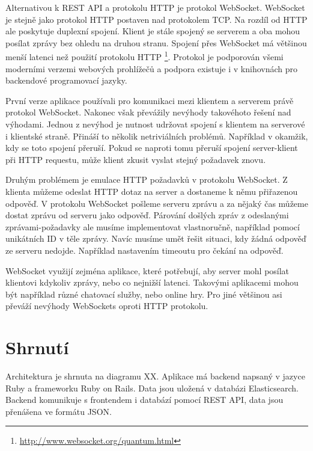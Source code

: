 Alternativou k REST API a protokolu HTTP je protokol WebSocket. WebSocket je stejně jako protokol HTTP postaven nad protokolem TCP. Na rozdíl od HTTP ale poskytuje duplexní spojení. Klient je stále spojený se serverem a oba mohou posílat zprávy bez ohledu na druhou stranu. Spojení přes WebSocket má většinou menší latenci než použití protokolu HTTP \footnote{\url{http://www.websocket.org/quantum.html}}. Protokol je podporován všemi moderními verzemi webových prohlížečů a podpora existuje i v knihovnách pro backendové programovací jazyky.

První verze aplikace používali pro komunikaci mezi klientem a serverem právě protokol WebSocket. Nakonec však převážily nevýhody takovéhoto řešení nad výhodami. Jednou z nevýhod je nutnost udržovat spojení s klientem na serverové i klientské straně. Přináší to několik netriviálních problémů. Například v okamžik, kdy se toto spojení přeruší. Pokud se naproti tomu přeruší spojení server-klient při HTTP requestu, může klient zkusit vyslat stejný požadavek znovu.

Druhým problémem je emulace HTTP požadavků v protokolu WebSocket. Z klienta můžeme odeslat HTTP dotaz na server a dostaneme k němu přiřazenou odpověď. V protokolu WebSocket pošleme serveru zprávu a za nějaký čas můžeme dostat zprávu od serveru jako odpověď. Párování došlých zpráv z odeslanými zprávami-požadavky ale musíme implementovat vlastnoručně, například pomocí unikátních ID v těle zprávy. Navíc musíme umět řešit situaci, kdy žádná odpověď ze serveru nedojde. Například nastavením timeoutu pro čekání na odpověď.

WebSocket využijí zejména aplikace, které potřebují, aby server mohl posílat klientovi kdykoliv zprávy, nebo co nejnižší latenci. Takovými aplikacemi mohou být například různé chatovací služby, nebo online hry. Pro jiné většinou asi převáží nevýhody WebSockets oproti HTTP protokolu.

\section{Shrnutí}

Architektura je shrnuta na diagramu XX. Aplikace má backend napsaný v jazyce Ruby a frameworku Ruby on Rails. Data jsou uložená v databázi Elasticsearch. Backend komunikuje s frontendem i databází pomocí REST API, data jsou přenášena ve formátu JSON.








